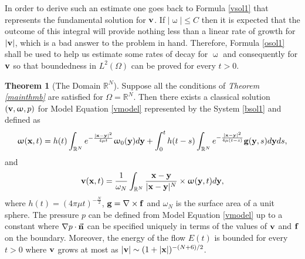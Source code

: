 \documentclass[a4 paper, 11pt,twoside]{article}
\newcommand{\Bf}[1]{{\bf{#1}}}
\newcommand{\V}{{\bf{v}}}
\newcommand{\X}{{\bf{x}}}
\newcommand{\Y}{{\bf{y}}}
\newcommand{\0}{\Bf{0}}
\newcommand{\F}{{\bf{f}}}
\theoremstyle{definition}
\newtheorem{theorem}{Theorem}
\begin{document}
In order to derive such an estimate one goes back to Formula \eqref{vsol1} that represents the fundamental solution for $\V$. If $|\upomega|\leq C$ then it is expected that the outcome of this integral will provide nothing less than a linear rate of growth for $|\V|$, which is a bad answer to the problem in hand. Therefore, Formula \eqref{osol1} shall be used to help us estimate some rates of decay for $\upomega$ and consequently for $\V$ so that boundedness in $L^2(\Omega)$ can be proved for every $t>0$.
\begin{theorem}[The Domain $\mathbb{R}^N$]
Suppose all the conditions of {\it Theorem \ref{mainthmb}} are satisfied for $\Omega=\mathbb{R}^N$. Then there exists a classical solution $(\V,\upomega,p)$ for Model Equation \eqref{vmodel} represented by the System \eqref{bsol1} and defined as
\begin{equation}
\upomega(\X,t)=h(t)\int_{\mathbb{R}^N}e^{-\frac{|\X-\Y|^2}{4\mu t}}\upomega_0(\Y)d\Y+\int_0^th(t-s)\int_{\mathbb{R}^N}e^{-\frac{|\X-\Y|^2}{4\mu (t-s)}}\Bf{g}(\Y,s)d\Y ds,
\label{osol2}
\end{equation}
and
\begin{equation}
\V(\X,t)=\frac{1}{\omega_N}\int_{\mathbb{R}^N}\frac{\X-\Y}{|\X-\Y|^N}\times\upomega(\Y,t)d\Y,
\label{vsol2}
\end{equation}
where $h(t)=(4\pi\mu t)^{-\frac{N}{2}}$, $\Bf{g}=\nabla\times\F$ and $\omega_N$ is the surface area of a unit sphere. The pressure $p$ can be defined from Model Equation \eqref{vmodel} up to a constant where $\nabla p\cdot\vec{\Bf{n}}$ can be specified uniquely in terms of the values of $\V$ and $\F$ on the boundary. Moreover, the energy of the flow $E(t)$ is bounded for every $t>0$ where $\V$ grows at most as $|\V|\sim(1+|\X|)^{-(N+6)/2}$.
\label{mainthmR}
\end{theorem}
\end{document}
